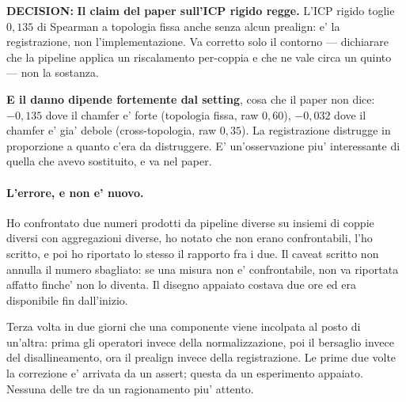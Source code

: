 \documentclass[11pt,a4paper]{article}
\newcommand{\decision}[1]{\textcolor{decision}{\textbf{DECISION:}} #1}
\begin{document}
\decision{\textbf{Il claim del paper sull'ICP rigido regge.} L'ICP rigido toglie $0{,}135$ di
Spearman a topologia fissa anche senza alcun prealign: e' la registrazione, non
l'implementazione. Va corretto solo il contorno --- dichiarare che la pipeline applica un
riscalamento per-coppia e che ne vale circa un quinto --- non la sostanza.

\textbf{E il danno dipende fortemente dal setting}, cosa che il paper non dice: $-0{,}135$ dove
il chamfer e' forte (topologia fissa, raw $0{,}60$), $-0{,}032$ dove il chamfer e' gia' debole
(cross-topologia, raw $0{,}35$). La registrazione distrugge in proporzione a quanto c'era da
distruggere. E' un'osservazione piu' interessante di quella che avevo sostituito, e va nel
paper.}

\paragraph{L'errore, e non e' nuovo.} Ho confrontato due numeri prodotti da pipeline diverse su
insiemi di coppie diversi con aggregazioni diverse, ho notato che non erano confrontabili, l'ho
scritto, e poi ho riportato lo stesso il rapporto fra i due. Il caveat scritto non annulla il
numero sbagliato: se una misura non e' confrontabile, non va riportata affatto finche' non lo
diventa. Il disegno appaiato costava due ore ed era disponibile fin dall'inizio.

Terza volta in due giorni che una componente viene incolpata al posto di un'altra: prima gli
operatori invece della normalizzazione, poi il bersaglio invece del disallineamento, ora il
prealign invece della registrazione. Le prime due volte la correzione e' arrivata da un assert;
questa da un esperimento appaiato. Nessuna delle tre da un ragionamento piu' attento.
\end{document}
